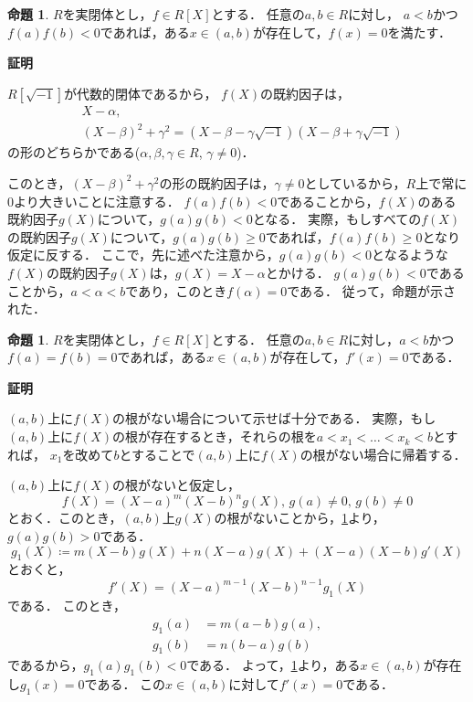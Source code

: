\documentclass[uplatex, dvipdfmx]{jsarticle}
\makeatletter
\numberwithin{equation}{section}
\renewenvironment{proof}[1][\proofname]{\par
  \pushQED{\qed}%
  \normalfont \topsep6\p@\@plus6\p@\relax
  \trivlist
  \item\relax
  {\bfseries
  #1\@addpunct{.}}\hspace\labelsep\ignorespaces
}{
  \popQED\endtrivlist\@endpefalse
}
\theoremstyle{definition}
\newtheorem{proposition}[definition]{命題}
\renewcommand{\proofname}{\textbf{証明}}
\makeatother
\begin{document}
\begin{proposition}\label{proposition:intermediate}
     $R$を実閉体とし，$f \in R[X]$とする．
     任意の$a,b \in R$に対し，
     $a < b$かつ
     $f(a)f(b)<0$であれば，ある$x \in (a,b)$が存在して，$f(x)=0$を満たす．
\end{proposition}
\begin{proof}
     $R[\sqrt{-1}]$が代数的閉体であるから，
     $f(X)$の既約因子は，
     \begin{align}
          &X-\alpha, \\
          &(X-\beta)^2 + \gamma^2 = (X-\beta-\gamma\sqrt{-1})(X-\beta+\gamma\sqrt{-1})
     \end{align}
     の形のどちらかである($\alpha, \beta, \gamma \in R$, $\gamma \neq 0$)．

     このとき，$(X-\beta)^2 + \gamma^2$の形の既約因子は，$\gamma \neq 0$としているから，$R$上で常に$0$より大きいことに注意する．
     $f(a)f(b)<0$であることから，$f(X)$のある既約因子$g(X)$について，$g(a)g(b)<0$となる．
     実際，もしすべての$f(X)$の既約因子$g(X)$について，$g(a)g(b) \geq 0$であれば，$f(a)f(b)\geq0$となり仮定に反する．
     ここで，先に述べた注意から，$g(a)g(b)<0$となるような$f(X)$の既約因子$g(X)$は，$g(X) = X - \alpha$とかける．
     $g(a)g(b) < 0$であることから，$a<\alpha<b$であり，このとき$f(\alpha)=0$である．
     従って，命題が示された．
\end{proof}

\begin{proposition}\label{proposition:Rolle}
     $R$を実閉体とし，$f \in R[X]$とする．
     任意の$a, b \in R$に対し，$a<b$かつ
     $f(a)=f(b)=0$であれば，ある$x \in (a,b)$が存在して，$f'(x)=0$である．
\end{proposition}
\begin{proof}
     $(a,b)$上に$f(X)$の根がない場合について示せば十分である．
     実際，もし$(a,b)$上に$f(X)$の根が存在するとき，それらの根を$a < x_1 < \dots < x_k < b$とすれば，
     $x_1$を改めて$b$とすることで$(a,b)$上に$f(X)$の根がない場合に帰着する．

     $(a,b)$上に$f(X)$の根がないと仮定し，
     \begin{equation}
     f(X) = (X-a)^m(X-b)^ng(X), \, g(a)\neq0,\, g(b)\neq0
     \end{equation}
     とおく．このとき，$(a,b)$上$g(X)$の根がないことから，\cref{proposition:intermediate}より，$g(a)g(b)>0$である．
     \begin{equation}
     g_1(X) \coloneqq m(X-b)g(X)+n(X-a)g(X)+(X-a)(X-b)g'(X)
     \end{equation}
     とおくと，
     \begin{equation}
          f'(X) = (X-a)^{m-1}(X-b)^{n-1}g_1(X)
     \end{equation}
     である．
     このとき，
     \begin{align}
     g_1(a) &= m(a-b)g(a), \\
     g_1(b) &= n(b-a)g(b)
     \end{align}
     であるから，$g_1(a)g_1(b)<0$である．
     よって，\cref{proposition:intermediate}より，ある$x \in (a, b)$が存在し$g_1(x)=0$である．
     この$x \in (a,b)$に対して$f'(x)=0$である．
\end{proof}
\end{document}
